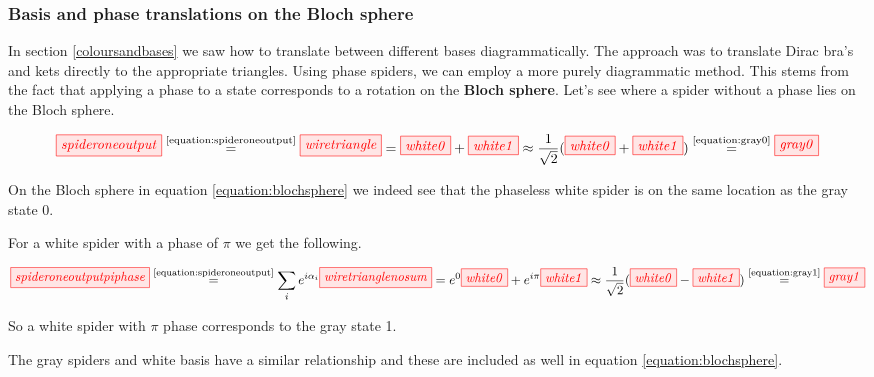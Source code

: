 \documentclass[]{article}
\newcommand{\equaltext}[1]{\ensuremath{\stackrel{\text{#1}}{=}}}
\begin{document}
\subsubsection{Basis and phase translations on the Bloch sphere}
\label{section:basisandphasetranslations}
In section \ref{coloursandbases} we saw how to translate between different bases diagrammatically. The approach was to translate Dirac bra's and kets directly to the appropriate triangles. Using phase spiders, we can employ a more purely diagrammatic method. This stems from the fact that applying a phase to a state corresponds to a rotation on the \textbf{Bloch sphere}. Let's see where a spider without a phase lies on the Bloch sphere.

\begin{equation}
\tikzfig{spideroneoutput} \equaltext{\ref{equation:spideroneoutput}} \tikzfig{wiretriangle} = \tikzfig{white0} + \tikzfig{white1} \approx \frac{1}{\sqrt{2}}(\tikzfig{white0} + \tikzfig{white1}) \equaltext{\ref{equation:gray0}} \tikzfig{gray0}
\end{equation}

On the Bloch sphere in equation \ref{equation:blochsphere} we indeed see that the phaseless white spider is on the same location as the gray state 0.

For a white spider with a phase of $\pi$ we get the following.

\begin{equation}
\tikzfig{spideroneoutputpiphase} \equaltext{\ref{equation:spideroneoutput}} \sum\limits_{i} e^{i\alpha_i}\tikzfig{wiretrianglenosum} = e^{0}\tikzfig{white0} + e^{i\pi}\tikzfig{white1} \approx \frac{1}{\sqrt{2}}(\tikzfig{white0} - \tikzfig{white1}) \equaltext{\ref{equation:gray1}} \tikzfig{gray1}
\end{equation}

So a white spider with $\pi$ phase corresponds to the gray state 1. 

The gray spiders and white basis have a similar relationship and these are included as well in equation \ref{equation:blochsphere}.
\end{document}
